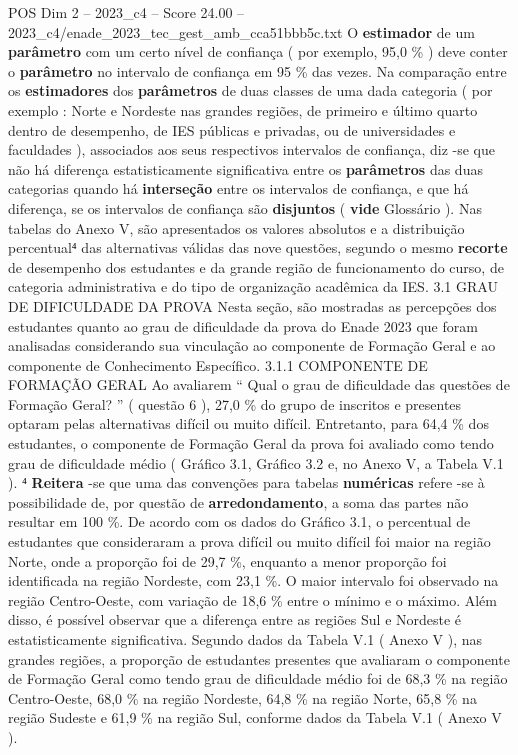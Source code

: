 \begin{textsample}{POS Dim 2 – 2023\_c4 – Score 24.00 – 2023\_c4/enade\_2023\_tec\_gest\_amb\_cca51bbb5c.txt}
O \textbf{estimador} de um \textbf{parâmetro} com um certo nível de confiança ( por exemplo, 95,0 \% ) deve conter o \textbf{parâmetro} no intervalo de confiança em 95 \% das vezes.
Na comparação entre os \textbf{estimadores} dos \textbf{parâmetros} de duas classes de uma dada categoria ( por exemplo : Norte e Nordeste nas grandes regiões, de primeiro e último quarto dentro de desempenho, de IES públicas e privadas, ou de universidades e faculdades ), associados aos seus respectivos intervalos de confiança, diz -se que não há diferença estatisticamente significativa entre os \textbf{parâmetros} das duas categorias quando há \textbf{interseção} entre os intervalos de confiança, e que há diferença, se os intervalos de confiança são \textbf{disjuntos} ( \textbf{vide} Glossário ).
Nas tabelas do Anexo V, são apresentados os valores absolutos e a distribuição percentual⁴ das alternativas válidas das nove questões, segundo o mesmo \textbf{recorte} de desempenho dos estudantes e da grande região de funcionamento do curso, de categoria administrativa e do tipo de organização acadêmica da IES. 3.1 GRAU DE DIFICULDADE DA PROVA Nesta seção, são mostradas as percepções dos estudantes quanto ao grau de dificuldade da prova do Enade 2023 que foram analisadas considerando sua vinculação ao componente de Formação Geral e ao componente de Conhecimento Específico. 3.1.1 COMPONENTE DE FORMAÇÃO GERAL Ao avaliarem “ Qual o grau de dificuldade das questões de Formação Geral? ” ( questão 6 ), 27,0 \% do grupo de inscritos e presentes optaram pelas alternativas difícil ou muito difícil.
Entretanto, para 64,4 \% dos estudantes, o componente de Formação Geral da prova foi avaliado como tendo grau de dificuldade médio ( Gráfico 3.1, Gráfico 3.2 e, no Anexo V, a Tabela V.1 ). ⁴ \textbf{Reitera} -se que uma das convenções para tabelas \textbf{numéricas} refere -se à possibilidade de, por questão de \textbf{arredondamento}, a soma das partes não resultar em 100 \%.
De acordo com os dados do Gráfico 3.1, o percentual de estudantes que consideraram a prova difícil ou muito difícil foi maior na região Norte, onde a proporção foi de 29,7 \%, enquanto a menor proporção foi identificada na região Nordeste, com 23,1 \%.
O maior intervalo foi observado na região Centro-Oeste, com variação de 18,6 \% entre o mínimo e o máximo.
Além disso, é possível observar que a diferença entre as regiões Sul e Nordeste é estatisticamente significativa.
Segundo dados da Tabela V.1 ( Anexo V ), nas grandes regiões, a proporção de estudantes presentes que avaliaram o componente de Formação Geral como tendo grau de dificuldade médio foi de 68,3 \% na região Centro-Oeste, 68,0 \% na região Nordeste, 64,8 \% na região Norte, 65,8 \% na região Sudeste e 61,9 \% na região Sul, conforme dados da Tabela V.1 ( Anexo V ).

\end{textsample}
